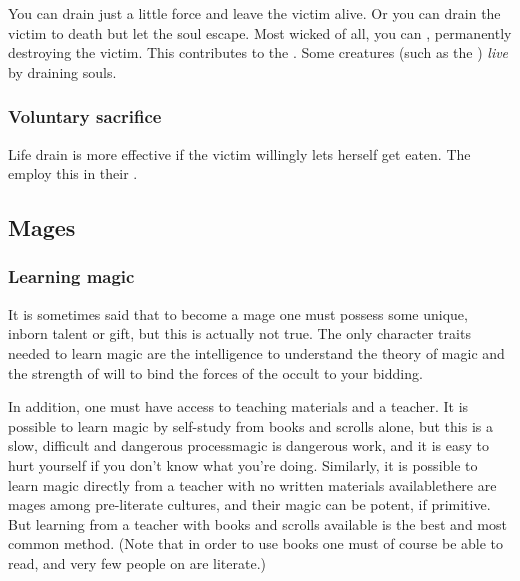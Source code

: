 You can drain just a little force and leave the victim alive. 
Or you can drain the victim to death but let the soul escape. 
Most wicked of all, you can , permanently destroying the victim. 
This contributes to the . 
Some creatures (such as the ) \emph{live} by draining souls. 





\subsubsection{Voluntary sacrifice}
Life drain is more effective if the victim willingly lets herself get eaten. 
The \resphain{} employ this in their . 









\subsection{Mages}









\subsubsection{Learning magic}
It is sometimes said that to become a mage one must possess some unique, inborn talent or gift, but this is actually not true. The only character traits needed to learn magic are the intelligence to understand the theory of magic and the strength of will to bind the forces of the occult to your bidding. 

In addition, one must have access to teaching materials and a teacher. It is possible to learn magic by self-study from books and scrolls alone, but this is a slow, difficult and dangerous process\dash{}magic is dangerous work, and it is easy to hurt yourself if you don't know what you're doing. Similarly, it is possible to learn magic directly from a teacher with no written materials available\dash{}there are mages among pre-literate cultures, and their magic can be potent, if primitive. But learning from a teacher with books and scrolls available is the best and most common method. (Note that in order to use books one must of course be able to read, and very few people on \Miith{} are literate.) 

